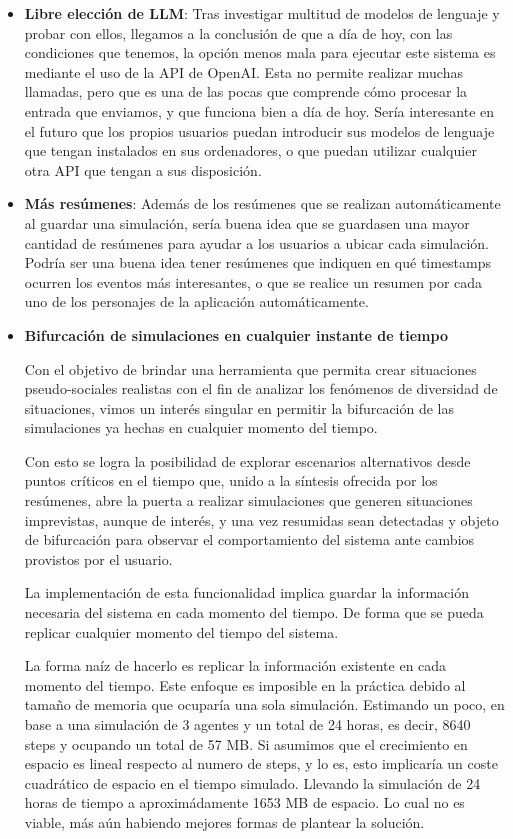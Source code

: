 \begin{itemize}
	\item \textbf{Libre elección de LLM}: Tras investigar multitud de modelos de lenguaje y probar con ellos, llegamos a la conclusión de que a día de hoy, con las condiciones que tenemos, la opción menos mala para ejecutar este sistema es mediante el uso de la API de OpenAI. Esta no permite realizar muchas llamadas, pero que es una de las pocas que comprende cómo procesar la entrada que enviamos, y que funciona bien a día de hoy. Sería interesante en el futuro que los propios usuarios puedan introducir sus modelos de lenguaje que tengan instalados en sus ordenadores, o que puedan utilizar cualquier otra API que tengan a sus disposición.
	
	\item \textbf{Más resúmenes}: Además de los resúmenes que se realizan automáticamente al guardar una simulación, sería buena idea que se guardasen una mayor cantidad de resúmenes para ayudar a los usuarios a ubicar cada simulación. Podría ser una buena idea tener resúmenes que indiquen en qué timestamps ocurren los eventos más interesantes, o que se realice un resumen por cada uno de los personajes de la aplicación automáticamente.

	\item\textbf{Bifurcación de simulaciones en cualquier instante de tiempo}

Con el objetivo de brindar una herramienta que permita crear situaciones pseudo-sociales realistas con el fin de analizar los fenómenos de diversidad de situaciones, vimos un interés singular en permitir la bifurcación de las simulaciones ya hechas en cualquier momento del tiempo.

Con esto se logra la posibilidad de explorar escenarios alternativos desde puntos críticos en el tiempo que, unido a la síntesis ofrecida por los resúmenes, abre la puerta a realizar simulaciones que generen situaciones imprevistas, aunque de interés, y una vez resumidas sean detectadas y objeto de bifurcación para observar el comportamiento del sistema ante cambios provistos por el usuario.

La implementación de esta funcionalidad implica guardar la información necesaria del sistema en cada momento del tiempo. De forma que se pueda replicar cualquier momento del tiempo del sistema. 

La forma naíz de hacerlo es replicar la información existente en cada momento del tiempo. Este enfoque es imposible en la práctica debido al tamaño de memoria que ocuparía una sola simulación. Estimando un poco, en base a una simulación de 3 agentes y un total de 24 horas, es decir, 8640 steps y ocupando un total de 57 MB. Si asumimos que el crecimiento en espacio es lineal respecto al numero de steps, y lo es, esto implicaría un coste cuadrático de espacio en el tiempo simulado. Llevando la simulación de 24 horas de tiempo a aproximádamente 1653 MB de espacio. Lo cual no es viable, más aún habiendo mejores formas de plantear la solución.	

\end{itemize}

